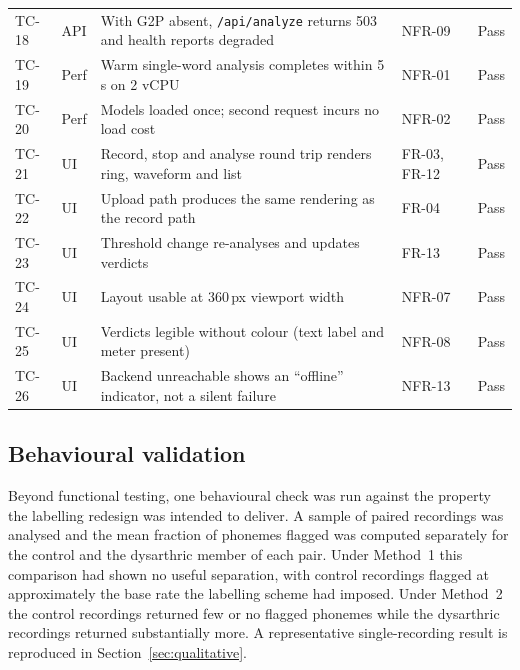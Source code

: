 \begin{table}[H]
\begin{tabularx}{\textwidth}{@{}p{1.15cm}p{2.6cm}Xp{1.5cm}p{1.0cm}@{}}
TC-18 & API & With G2P absent, \texttt{/api/analyze} returns 503 and health reports degraded & NFR-09 & Pass \\
TC-19 & Perf & Warm single-word analysis completes within 5\,s on 2 vCPU & NFR-01 & Pass \\
TC-20 & Perf & Models loaded once; second request incurs no load cost & NFR-02 & Pass \\
TC-21 & UI & Record, stop and analyse round trip renders ring, waveform and list & FR-03, FR-12 & Pass \\
TC-22 & UI & Upload path produces the same rendering as the record path & FR-04 & Pass \\
TC-23 & UI & Threshold change re-analyses and updates verdicts & FR-13 & Pass \\
TC-24 & UI & Layout usable at 360\,px viewport width & NFR-07 & Pass \\
TC-25 & UI & Verdicts legible without colour (text label and meter present) & NFR-08 & Pass \\
TC-26 & UI & Backend unreachable shows an ``offline'' indicator, not a silent failure & NFR-13 & Pass \\
\bottomrule
\end{tabularx}
\end{table}

\subsection{Behavioural validation}

Beyond functional testing, one behavioural check was run against the property
the labelling redesign was intended to deliver. A sample of paired recordings
was analysed and the mean fraction of phonemes flagged was computed separately
for the control and the dysarthric member of each pair. Under Method~1 this
comparison had shown no useful separation, with control recordings flagged at
approximately the base rate the labelling scheme had imposed. Under Method~2 the
control recordings returned few or no flagged phonemes while the dysarthric
recordings returned substantially more. A representative single-recording result
is reproduced in Section~\ref{sec:qualitative}.
